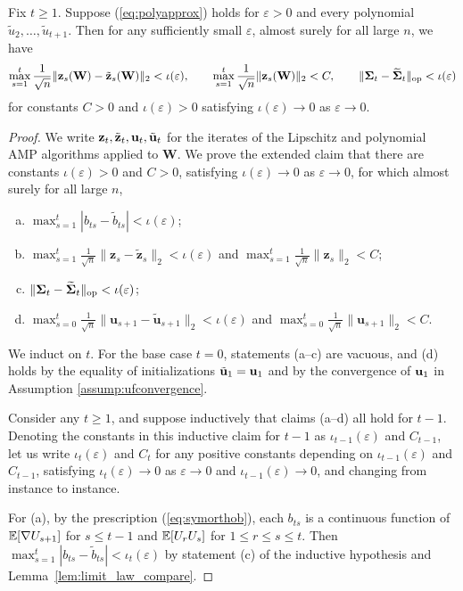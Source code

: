 \documentclass[10pt,reqno]{amsart}
\def\W{\mathbf{W}}
\def\op{\mathrm{op}}
\def\bu{{\mathbf{u}}}
\def\bz{{\mathbf{z}}}
\def\eps{\varepsilon}
\begin{document}
\begin{lemma}\label{lemma:AMPpolyAPprox}
Fix $t \geq 1$. Suppose (\ref{eq:polyapprox}) holds for $\eps>0$ and
every polynomial $\tilde u_2,\ldots,\tilde u_{t+1}$. Then for any sufficiently
small $\eps$, almost surely for all large $n$, we have
\[\max_{s=1}^t \frac{1}{\sqrt{n}} \|\zb_s(\W) - \tilde\zb_s(\W)\|_2<\iota(\eps),
\qquad \max_{s=1}^t \frac{1}{\sqrt{n}} \|\zb_s(\W)\|_2<C,
\qquad \|\bSigma_t - \widetilde{\bSigma}_t\|_\op<\iota(\eps)\]
for constants $C>0$ and $\iota(\eps)>0$ satisfying $\iota(\eps) \to 0$ as
$\eps \to 0$.
\end{lemma}
\begin{proof}
We write $\mathbf{z}_t,\tilde {\mathbf{z}}_t,\mathbf{u}_t,\tilde {\mathbf{u}}_t$ for the iterates of the
Lipschitz and polynomial AMP algorithms applied to $\W$.
We prove the extended claim that there are constants $\iota(\eps)>0$ and $C>0$,
satisfying $\iota(\eps) \to 0$ as $\eps \to 0$,
for which almost surely for all large $n$,
\begin{enumerate}[(a)]
\item $\max_{s=1}^t |b_{ts} - \tilde b_{ts}|<\iota(\eps)$;
\item $\max_{s=1}^t \frac{1}{\sqrt{n}} \|\bz_s - \tilde\bz_s\|_2<\iota(\eps)$
and $\max_{s=1}^t \frac{1}{\sqrt{n}} \|\bz_s\|_2<C$;
\item $\|\bSigma_t - \widetilde{\bSigma}_t\|_\op<\iota(\eps)$;
\item $\max_{s=0}^t \frac{1}{\sqrt{n}} 
\|\bu_{s+1} - \tilde\bu_{s+1}\|_2<\iota(\eps)$
and $\max_{s=0}^t \frac{1}{\sqrt{n}} \|\bu_{s+1}\|_2<C$.
\end{enumerate}

We induct on $t$. For the base case $t=0$, statements (a--c) are vacuous, and
(d) holds by the equality of initializations $\tilde {\mathbf{u}}_1 = \mathbf{u}_1$ and by the
convergence of $\mathbf{u}_1$ in Assumption \ref{assump:ufconvergence}.

Consider any $t \geq 1$, and suppose inductively that claims (a--d) all hold
for $t-1$. Denoting the constants in this inductive claim for $t-1$ as
$\iota_{t-1}(\eps)$ and $C_{t-1}$, let us write $\iota_t(\eps)$ and $C_t$ for
any positive constants depending on $\iota_{t-1}(\eps)$ and $C_{t-1}$,
satisfying $\iota_t(\eps) \to 0$ as $\eps \to 0$ and 
$\iota_{t-1}(\eps) \to 0$, and changing from instance to instance.

For (a), by the prescription (\ref{eq:symorthob}), each
$b_{ts}$ is a continuous function of $\mathbb{E}[\nabla U_{s+1}]$ for $s \leq t-1$
and $\mathbb{E}[U_r U_s]$ for $1 \leq r \leq s \leq t$. Then 
$\max_{s=1}^t |b_{ts}-\tilde b_{ts}|<\iota_t(\eps)$ by statement (c) of the
inductive hypothesis and Lemma~\ref{lem:limit_law_compare}.


\end{proof}
\end{document}
